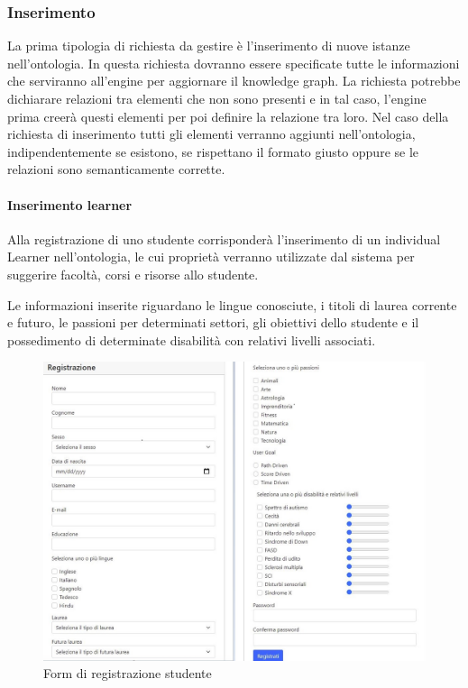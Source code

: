 \subsubsection{Inserimento}
La prima tipologia di richiesta da gestire è l'inserimento di nuove istanze nell'ontologia. In questa richiesta dovranno essere specificate tutte le informazioni che serviranno all'engine per aggiornare il knowledge graph. La richiesta potrebbe dichiarare relazioni tra elementi che non sono presenti e in tal caso, l'engine prima creerà questi elementi per poi definire la relazione tra
loro. Nel caso della richiesta di inserimento tutti gli elementi verranno aggiunti nell'ontologia, indipendentemente se esistono, se rispettano il formato giusto oppure se le relazioni sono semanticamente corrette.

\paragraph{Inserimento learner}
Alla registrazione di uno studente corrisponderà l'inserimento di un individual Learner nell'ontologia, le cui proprietà verranno utilizzate dal sistema per suggerire facoltà, corsi e risorse allo studente.

Le informazioni inserite riguardano le lingue conosciute, i titoli di laurea corrente e futuro, le passioni per determinati settori, gli obiettivi dello studente e il possedimento di determinate disabilità con relativi livelli associati.

\begin{figure}[H]
\centering
\includegraphics[scale=0.4]{res/registrazione.jpg}
\caption{Form di registrazione studente}
\label{fig:registration}
\end{figure}

